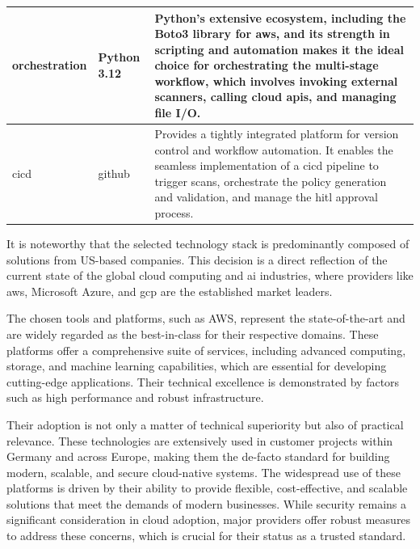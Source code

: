 \begin{center}
\begin{tabular}{|l|l|p{7cm}|}
\hline
\gls{orchestration} & Python 3.12 \cite{noauthor_whats_nodate} & Python's extensive ecosystem, including the Boto3 library for \gls{aws}, and its strength in scripting and automation makes it the ideal choice for orchestrating the multi-stage workflow, which involves invoking external scanners, calling cloud \gls{api}s, and managing file I/O. \\
\hline
\gls{cicd} & \gls{github} \cite{noauthor_github_2025} & Provides a tightly integrated platform for version control and workflow automation. It enables the seamless implementation of a \gls{cicd} pipeline to trigger scans, orchestrate the policy generation and validation, and manage the \gls{hitl} approval process. \\
\hline
\end{tabular}
\label{tab:tech_stack}
\end{center}

It is noteworthy that the selected technology stack is predominantly composed of solutions from US-based companies. This decision is a direct reflection of the current state of the global cloud computing and \gls{ai} industries, where providers like \gls{aws}, Microsoft Azure, and \gls{gcp} are the established market leaders\cite{n_koritala_cloud-first_2025}.

The chosen tools and platforms, such as AWS, represent the state-of-the-art and are widely regarded as the best-in-class for their respective domains. These platforms offer a comprehensive suite of services, including advanced computing, storage, and machine learning capabilities, which are essential for developing cutting-edge applications. Their technical excellence is demonstrated by factors such as high performance and robust infrastructure\cite{patel_comparative_nodate}.

Their adoption is not only a matter of technical superiority but also of practical relevance. These technologies are extensively used in customer projects within Germany and across Europe, making them the de-facto standard for building modern, scalable, and secure cloud-native systems\cite{noauthor_european_nodate}. The widespread use of these platforms is driven by their ability to provide flexible, cost-effective, and scalable solutions that meet the demands of modern businesses. While security remains a significant consideration in cloud adoption, major providers offer robust measures to address these concerns, which is crucial for their status as a trusted standard\cite{noauthor_european_nodate}.

